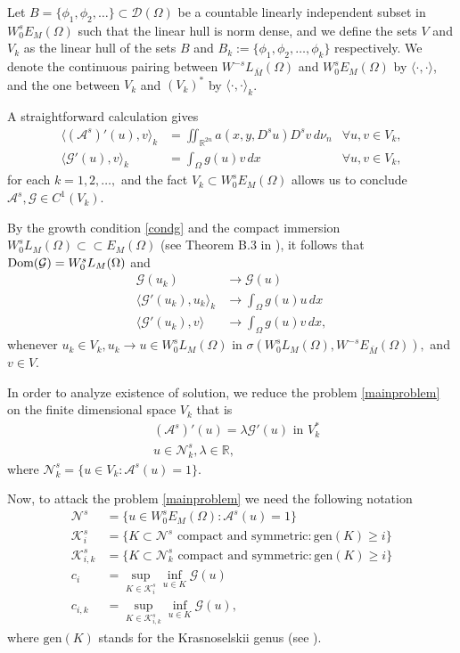 \documentclass{amsart}
\def\Dom{\text{\normalfont Dom}}
\newcommand{\R}{{\mathbb R}}
\newcommand{\EE}{{\mathcal A}^s}
\newcommand{\G}{{\mathcal G}}
\theoremstyle{remark}
\theoremstyle{definition}
\numberwithin{equation}{section}
\begin{document}
Let $B=\{\phi_1,\phi_2,\dots\}\subset {\mathcal D}(\Omega)$ be a countable linearly independent subset in $W_0^sE_M(\Omega)$ such that the linear hull is norm dense, and we define the sets $V$ and $V_k$ as the linear hull of the sets $B$ and $B_k:=\{\phi_1,\phi_2,\dots,\phi_k\}$ respectively. We denote the continuous pairing between $W^{-s}L_{\bar{M}}(\Omega)$ and $W^s_0E_M(\Omega)$ by $\langle \cdot, \cdot \rangle$, and the one between $V_k$ and $(V_k)^*$ by $\langle \cdot, \cdot \rangle_k$.

A straightforward calculation gives
\begin{align*}
\langle (\EE)'(u),v \rangle_k&=\iint_{\R^{2n}} a(x,y,D^su)D^s v\,d\nu_n &\forall u,v\in V_k, 	
\\
\langle \G'(u),v\rangle_k&=\int_\Omega g(u)v\,dx &\forall u,v\in V_k, 	
\end{align*} 
for each $k=1,2,\dots,$ and the fact $V_k\subset W^s_0E_M(\Omega)$ allows us to conclude $\EE,\G \in C^1(V_k)$.

By the growth condition \eqref{condg} and the compact immersion $W^s_0L_M(\Omega) \subset\subset E_M(\Omega)$ (see Theorem B.3 in \cite{FBSP}),  it follows that $\Dom(\G)=W_0^sL_M(\Omega)$ and 
\begin{align*}
\G(u_k) &\to \G(u)\\
\langle \G'(u_k),u_k\rangle_k &\to \int_\Omega g(u) u\, dx\\
\langle \G'(u_k),v\rangle &\to \int_\Omega g(u) v\, dx,
\end{align*}
whenever $u_k\in V_k, u_k\to u\in W_0^sL_M(\Omega)$ in $\sigma(W_0^sL_M(\Omega),W^{-s}E_{\bar{M}}(\Omega)),$ and $v\in V$.

In order to analyze existence of solution, we reduce the problem \eqref{mainproblem} on the finite dimensional space $V_k$ that is
\begin{equation}\label{eigenfinito}
\begin{split}
& (\EE)'(u)=\lambda \mathcal{G}'(u)\text{ in }V_k^*
\\
&u\in \mathcal{N}_k^s,\lambda\in \R, 
\end{split}
\end{equation}
where $\mathcal{N}_k^s=\{u\in V_k\colon \EE(u)=1\}$.

Now, to attack the problem \eqref{mainproblem} we need the following notation 
\begin{align*}
\mathcal{N}^s	&=\{u\in W_0^sE_M(\Omega)\colon \EE(u)=1\}
\\
\mathcal{K}_i^s&=\{K\subset \mathcal{N}^s\text{ compact and symmetric}\colon \text{gen}(K)\geq i\}
\\
\mathcal{K}_{i,k}^s&=\{K\subset \mathcal{N}_k^s\text{ compact and symmetric}\colon \text{gen}(K)\geq i \}
\\
c_i&=\sup_{K\in \mathcal{K}_i^s}\inf_{u\in K}\G(u)
\\
c_{i,k}&=\sup_{K\in \mathcal{K}_{i,k}^s}\inf_{u\in K}\G(u),
\end{align*}
where $\text{gen}(K)$ stands for the Krasnoselskii genus (see \cite[Chapter 7]{Rabi}).
\end{document}
